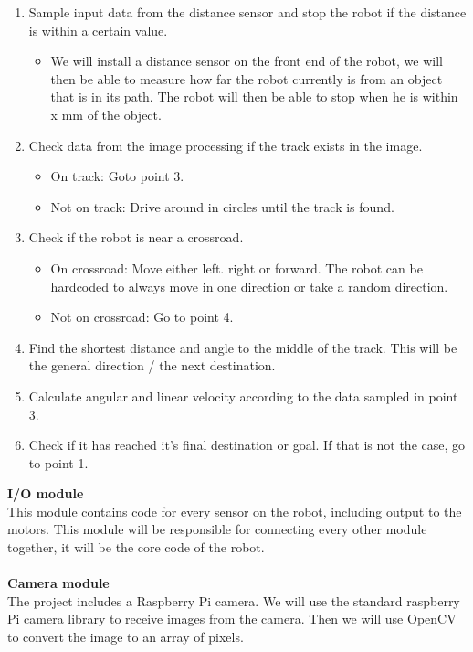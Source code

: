 \documentclass[11pt]{article}
\begin{document}
\begin{enumerate}
    \item Sample input data from the distance sensor and stop the robot if the distance is within a certain value. \begin{itemize}
        \item We will install a distance sensor on the front end of the robot, we will then be able to measure how far the robot currently is from an object that is in its path. The robot will then be able to stop when he is within x mm of the object. 
    \end{itemize}
    \item Check data from the image processing if the track exists in the image. \begin{itemize}
        \item On track: Goto point 3. 
        \item Not on track: Drive around in circles until the track is found.
    \end{itemize}
    \item Check if the robot is near a crossroad. \begin{itemize}
        \item On crossroad: Move either left. right or forward. The robot can be hardcoded to always move in one direction or take a random direction. 
        \item Not on crossroad: Go to point 4. 
    \end{itemize}
    \item Find the shortest distance and angle to the middle of the track. This will be the general direction / the next destination. 
    \item Calculate angular and linear velocity according to the data sampled in point 3. 
    \item Check if it has reached it's final destination or goal. If that is not the case, go to point 1.
\end{enumerate}
\textbf{I/O module}
\\
This module contains code for every sensor on the robot, including output to the motors. This module will be responsible for connecting every other module together, it will be the core code of the robot. 
\\\\
\textbf{Camera module}
\\
The project includes a Raspberry Pi camera. We will use the standard raspberry Pi camera library to receive images from the camera. Then we will use OpenCV to convert the image to an array of pixels.
\end{document}
